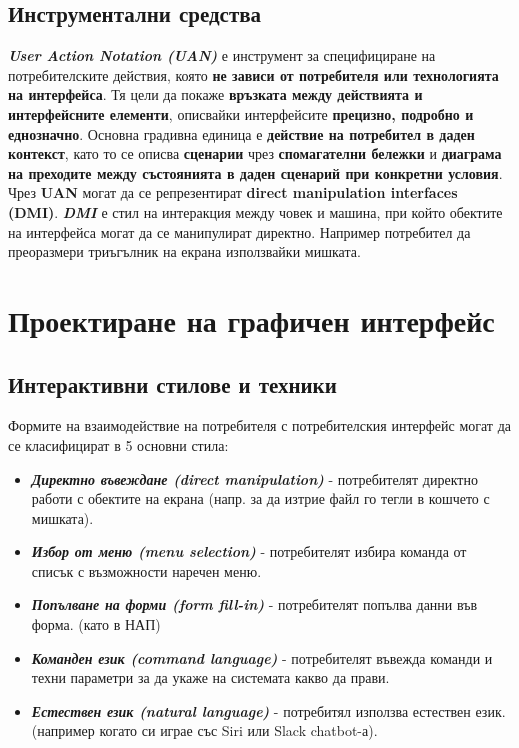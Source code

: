 \documentclass[fleqn,12pt]{article}
\begin{document}
\subsection{Инструментални средства}

\textit{\textbf{User Action Notation (UAN)}} е инструмент за специфициране на потребителските действия, която \textbf{не зависи от потребителя или технологията на интерфейса}.
Тя цели да покаже \textbf{връзката между действията и интерфейсните елементи}, описвайки интерфейсите \textbf{прецизно, подробно и еднозначно}.
\bigbreak
Основна градивна единица е \textbf{действие на потребител в даден контекст}, като то се описва \textbf{сценарии} чрез \textbf{спомагателни бележки} и \textbf{диаграма на преходите между състоянията в даден сценарий при конкретни условия}. 
\bigbreak
Чрез \textbf{UAN} могат да се репрезентират \textbf{direct manipulation interfaces (DMI)}.
\textit{\textbf{DMI}} е стил на интеракция между човек и машина, при който обектите на интерфейса могат да се манипулират директно.
Например потребител да преоразмери триъгълник на екрана използвайки мишката.

\section{Проектиране на графичен интерфейс}

\subsection{Интерактивни стилове и техники}

Формите на взаимодействие на потребителя с потребителския интерфейс могат да се класифицират в 5 основни стила:
\begin{itemize}
    \item \textbf{\textit{Директно въвеждане (direct manipulation)}} - потребителят директно работи с обектите на екрана (напр. за да изтрие файл го тегли в кошчето с мишката).
    \item \textbf{\textit{Избор от меню (menu selection)}} - потребителят избира команда от списък с възможности наречен меню.
    \item \textbf{\textit{Попълване на форми (form fill-in)}} - потребителят попълва данни във форма. (като в НАП)
    \item \textbf{\textit{Команден език (command language)}} - потребителят въвежда команди и техни параметри за да укаже на системата какво да прави.
    \item \textbf{\textit{Естествен език (natural language)}} - потребитял използва естествен език. (например когато си играе със Siri или Slack chatbot-а).
\end{itemize}
\end{document}
